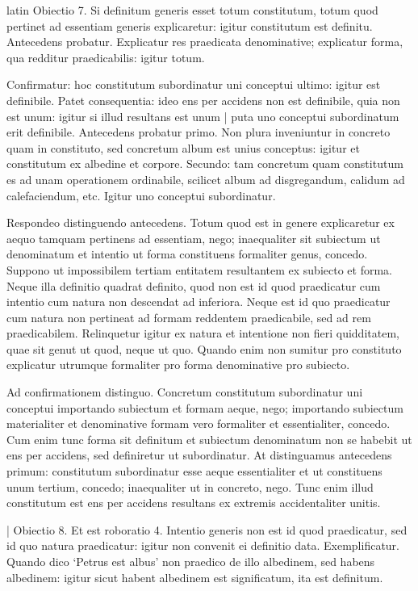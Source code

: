 \begin{otherlanguage*}{latin}
\pstart
Obiectio 7. Si definitum generis esset totum constitutum, totum quod pertinet ad essentiam generis explicaretur:
igitur constitutum est definitu. Antecedens probatur. Explicatur res praedicata denominative; explicatur forma, qua redditur praedicabilis:
igitur totum. 
\pend

\pstart
Confirmatur:
hoc constitutum subordinatur uni conceptui ultimo:
igitur est definibile. Patet consequentia:
ideo ens per accidens non est definibile, quia non est unum:
igitur si illud resultans est unum \textnormal{|} puta uno conceptui subordinatum erit definibile. Antecedens probatur primo. Non plura inveniuntur in concreto quam in constituto, sed concretum album est unius conceptus:
igitur et constitutum ex albedine et corpore. Secundo:
tam concretum quam constitutum es ad unam operationem ordinabile, scilicet album ad disgregandum, calidum ad calefaciendum, etc. Igitur uno conceptui subordinatur. 
\pend

\pstart
Respondeo distinguendo antecedens. Totum quod est in genere explicaretur ex aequo tamquam pertinens ad essentiam, nego; inaequaliter  sit subiectum ut denominatum et intentio ut forma constituens formaliter genus, concedo. Suppono ut impossibilem tertiam entitatem resultantem ex subiecto et forma. Neque illa definitio quadrat definito, quod non est id quod praedicatur cum intentio cum natura non descendat ad inferiora. Neque est id quo praedicatur cum natura non pertineat ad formam reddentem praedicabile, sed ad rem praedicabilem. Relinquetur igitur ex natura et intentione non fieri quidditatem, quae sit genut ut quod, neque ut quo. Quando enim non sumitur pro constituto explicatur utrumque formaliter pro forma denominative pro subiecto. 
\pend

\pstart
Ad confirmationem distinguo. Concretum constitutum subordinatur uni conceptui importando subiectum et formam aeque, nego; importando subiectum materialiter et denominative formam vero formaliter et essentialiter, concedo. Cum enim tunc forma sit definitum et subiectum denominatum non se habebit ut ens per accidens, sed definiretur ut subordinatur. At distinguamus antecedens primum:
constitutum subordinatur esse aeque essentialiter et ut constituens unum tertium, concedo; inaequaliter ut in concreto, nego. Tunc enim illud constitutum est ens per accidens resultans ex extremis accidentaliter unitis. 
\pend

\pstart
\textnormal{|} Obiectio 8. Et est roboratio 4. Intentio generis non est id quod praedicatur, sed id quo natura praedicatur:
igitur non convenit ei definitio data. Exemplificatur. Quando dico `Petrus est albus' non praedico de illo albedinem, sed habens albedinem:
igitur sicut habent albedinem est significatum, ita est definitum. 
\pend


\end{otherlanguage*}
